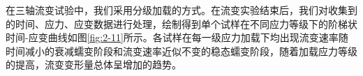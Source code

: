 在三轴流变试验中，我们采用分级加载的方式。在流变实验结束后，我们对收集到的时间、应力、应变数据进行处理，绘制得到单个试样在不同应力等级下的阶梯状时间-应变曲线如图\ref{fig:2-11}所示。各试样在每一级应力加载下均出现流变速率随时间减小的衰减蠕变阶段和流变速率近似不变的稳态蠕变阶段，随着加载应力等级的提高，流变变形量总体呈增加的趋势。


\begin{figure}[ht!]
    \centering
	

\end{figure}
